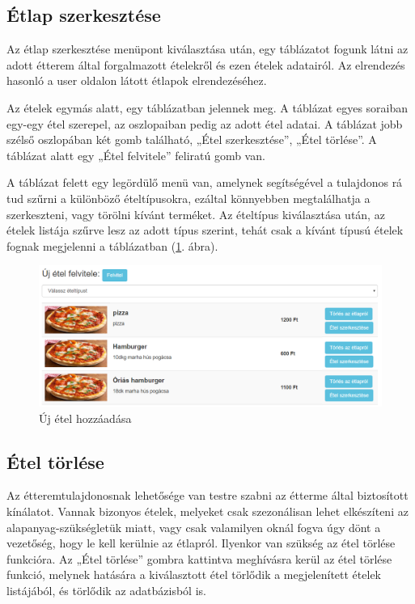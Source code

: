 \subsection{Étlap szerkesztése}

Az étlap szerkesztése menüpont kiválasztása után, egy táblázatot fogunk látni az adott étterem által forgalmazott ételekről és ezen ételek adatairól. Az elrendezés hasonló a user oldalon látott étlapok elrendezéséhez.

Az ételek egymás alatt, egy táblázatban jelennek meg. A táblázat egyes soraiban egy-egy étel szerepel, az oszlopaiban pedig az adott étel adatai. A táblázat jobb szélső oszlopában két gomb található, „Étel szerkesztése”, „Étel törlése”. A táblázat alatt egy „Étel felvitele” feliratú gomb van.

A táblázat felett egy legördülő menü van, amelynek segítségével a tulajdonos rá tud szűrni a különböző ételtípusokra, ezáltal könnyebben megtalálhatja a szerkeszteni, vagy törölni kívánt terméket. Az ételtípus kiválasztása után, az ételek listája szűrve lesz az adott típus szerint, tehát csak a kívánt típusú ételek fognak megjelenni a táblázatban (\ref{fig:new_meal}. ábra).

\begin{figure}
\centering
\includegraphics[scale=0.5]{kepek/new_meal.png}
\caption{Új étel hozzáadása}
\label{fig:new_meal}
\end{figure}

\subsection{Étel törlése}

Az étteremtulajdonosnak lehetősége van testre szabni az étterme által biztosított kínálatot. Vannak bizonyos ételek, melyeket csak szezonálisan lehet elkészíteni az alapanyag-szükségletük miatt, vagy csak valamilyen oknál fogva úgy dönt a vezetőség, hogy le kell kerülnie az étlapról. Ilyenkor van szükség az étel törlése funkcióra. Az „Étel törlése” gombra kattintva meghívásra kerül az étel törlése funkció, melynek hatására a kiválasztott étel törlődik a megjelenített ételek listájából, és törlődik az adatbázisból is.

